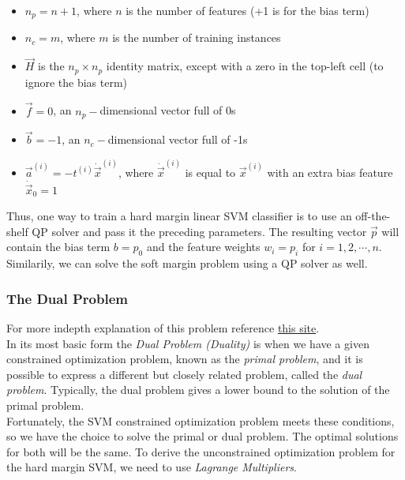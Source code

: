 \begin{itemize}
    \item $n_{p} = n + 1$, where $n$ is the number of features (+1 is for the bias term)
    \item $n_{c} = m$, where $m$ is the number of training instances
    \item $\vec{H}$ is the $n_{p} \times n_{p}$ identity matrix, except with a zero in the top-left cell (to ignore the bias term)
    \item $\vec{f} = 0$, an $n_{p}-$dimensional vector full of 0s
    \item $\vec{b} = -1$, an $n_{c}-$dimensional vector full of -1s
    \item $\vec{a}^{(i)} = -t^{(i)}\dot{\vec{x}}^{(i)}$, where $\dot{\vec{x}}^{(i)}$ is equal to $\vec{x}^{(i)}$ with an extra bias feature $\dot{\vec{x}}_{0} = 1$
\end{itemize}

\noindent
Thus, one way to train a hard margin linear SVM classifier is to use an off-the-shelf QP solver and pass it the 
preceding parameters. The resulting vector $\vec{p}$ will contain the bias term $b = p_{0}$ and the feature 
weights $w_{i} = p_{i}$ for $i = 1, 2, \cdots, n$. Similarily, we can solve the soft margin problem using 
a QP solver as well. 

\subsubsection*{The Dual Problem}

For more indepth explanation of this problem reference \href{https://en.wikipedia.org/wiki/Duality_(optimization)}{this site}.\\

\noindent
In its most basic form the \textit{Dual Problem (Duality)} is when we have a given constrained optimization
problem, known as the \textit{primal problem}, and it is possible to express a different but closely related 
problem, called the \textit{dual problem}. Typically, the dual problem gives a lower bound to the solution of the 
primal problem. \\

\noindent
Fortunately, the SVM constrained optimization problem meets these conditions, so we have the choice to solve the 
primal or dual problem. The optimal solutions for both will be the same. To derive the unconstrained optimization
problem for the hard margin SVM, we need to use \textit{Lagrange Multipliers}. \\

